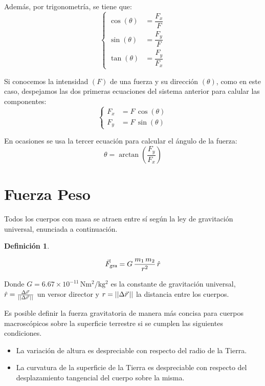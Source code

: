 \documentclass[a5paper,12pt,twoside]{book}
\newtheorem{defn}{{Definición}}[chapter]
\begin{document}
Además, por trigonometría, se tiene que:
\[
  \left\{
    \begin{aligned}
      \cos{(\theta)} &= \dfrac{F_x}{F}
      \\[1ex]
      \sin{(\theta)} &= \dfrac{F_y}{F}
      \\[1ex]
      \tan{(\theta)} &= \dfrac{F_y}{F_x}
    \end{aligned}
  \right.
\]

Si conocemos la intensidad $(F)$ de una fuerza y su dirección $(\theta)$, como en este caso, despejamos las dos primeras ecuaciones del sistema anterior para calular las componentes:
\[
  \left\{
  \begin{aligned}
    F_x &= F \, \cos{(\theta)}
    \\
    F_y &= F \, \sin{(\theta)}
  \end{aligned}
  \right.
\]

En ocasiones se usa la tercer ecuación para calcular el ángulo de la fuerza:
\[ \theta = \arctan{ \left( \dfrac{F_y}{F_x} \right) } \]


\section{Fuerza Peso}

Todos los cuerpos con masa se atraen entre sí según la ley de gravitación universal, enunciada a continuación.

\begin{mdframed}[style=MyFrame1]
    \begin{defn}
    \end{defn}
    \begin{equation*}
        {{\vec{F}}_\textsl{{gra}}} = G \, \frac{m_1 \, m_2}{r^2} \, \hat{r}
    \end{equation*}
\end{mdframed}

Donde $G = 6.67 \times 10^{-11} \, \si{\newton\metre^2\per\kilo\gram^2}$ es la constante de gravitación universal, $\hat{r}=\tfrac{\Delta \vec{r}\hspace{0.05cm}}{{\left|\left| {\Delta \vec{r}\hspace{0.05cm}} \right|\right|}}$ un versor director y $r={\left|\left| {\Delta \vec{r}\hspace{0.05cm}} \right|\right|}$ la distancia entre los cuerpos.

\begin{center}
    \def\svgwidth{0.6\linewidth}
    
\end{center}

Es posible definir la fuerza gravitatoria de manera más concisa para cuerpos macroscópicos sobre la superficie terrestre si se cumplen las siguientes condiciones.
\begin{itemize}
    \item La variación de altura es despreciable con respecto del radio de la Tierra.
    \item La curvatura de la superficie de la Tierra es despreciable con respecto del desplazamiento tangencial del cuerpo sobre la misma.
\end{itemize}
\end{document}
